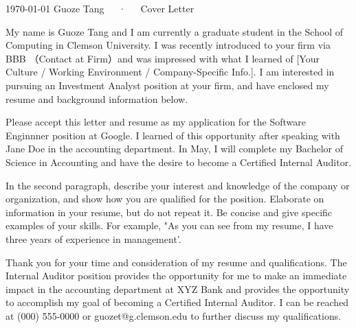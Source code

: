 \documentclass[12pt, letterpaper]{awesome-cv}
\makeatletter
\newcommand{\applyposition}{Software Enginnner}
\newcommand{\companyname}{Google}
\newcommand{\myemailaddress}{guozet@g.clemson.edu}
\makeatother
\begin{document}
\makecvheader[R]

\makecvfooter
  {\today}
  {Guoze Tang~~~·~~~Cover Letter}
  {}

\makelettertitle

\begin{cvletter}


My name is Guoze Tang and I am currently a graduate student in the School of Computing in Clemson University. I was recently introduced to your firm via BBB （Contact at Firm）and was impressed with what I learned of [Your Culture / Working Environment / Company-Specific Info.]. I am interested in pursuing an Investment Analyst position at your firm, and have enclosed my resume and background information below.

Please accept this letter and resume as my application for the \applyposition{} position at \companyname{}. I learned of this opportunity after speaking with Jane Doe in the accounting department. In May, I will complete my Bachelor of Science in Accounting and have the desire to become a Certified Internal Auditor.

In the second paragraph, describe your interest and knowledge of the company or organization, and show how you are qualified for the position. Elaborate on information in your resume, but do not repeat it. Be concise and give specific examples of your skills. For example, "As you can see from my resume, I have three years of experience in management'.

Thank you for your time and consideration of my resume and qualifications. The Internal Auditor position provides the opportunity for me to make an immediate impact in the accounting department at XYZ Bank and provides the opportunity to accomplish my goal of becoming a Certified Internal Auditor. I can be reached at (000) 555-0000 or \myemailaddress{} to further discuss my qualifications.



\end{cvletter}


\makeletterclosing
\end{document}

